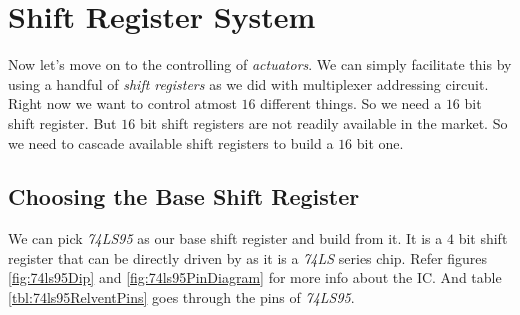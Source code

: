 \documentclass[../../main]{subfiles}
\begin{document}
\section{Shift Register System} \label{sec:}

Now let's move on to the controlling of \emph{actuators}. We can simply facilitate
this by using a handful of \emph{shift registers} as we did with multiplexer addressing
circuit. Right now we want to control atmost $16$ different things. So we need a $16$
bit shift register. But $16$ bit shift registers are not readily available in the market.
So we need to cascade available shift registers to build a $16$ bit one.

\subsection{Choosing the Base Shift Register}

We can pick \emph{74LS95} as our base shift register and build from it. It is
a $4$ bit shift register that can be directly driven by \esp as it is a \emph{74LS}
series chip. Refer figures \ref{fig:74ls95Dip} and \ref{fig:74ls95PinDiagram} for
more info about the IC. And table \ref{tbl:74ls95RelventPins} goes through the pins
of \emph{74LS95}.

\end{document}
